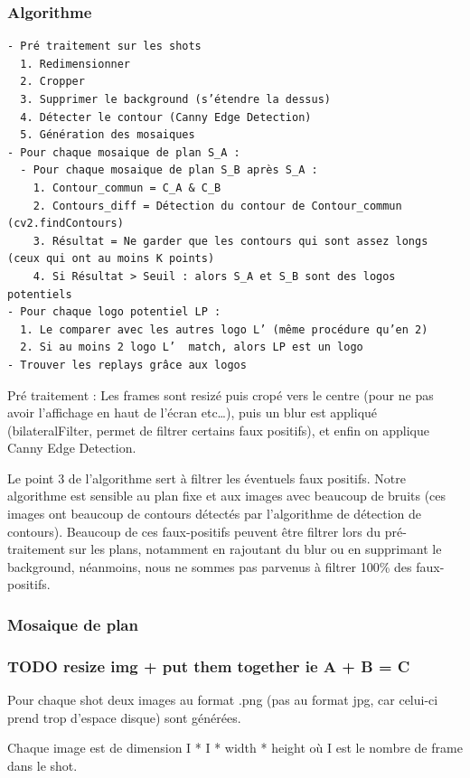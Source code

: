 \documentclass[11pt]{article}
\begin{document}
\subsubsection{Algorithme}
\label{sec:org46ef06d}
\begin{verbatim}
- Pré traitement sur les shots
  1. Redimensionner
  2. Cropper
  3. Supprimer le background (s’étendre la dessus)
  4. Détecter le contour (Canny Edge Detection)
  5. Génération des mosaiques
- Pour chaque mosaique de plan S_A :
  - Pour chaque mosaique de plan S_B après S_A :
    1. Contour_commun = C_A & C_B
    2. Contours_diff = Détection du contour de Contour_commun (cv2.findContours)
    3. Résultat = Ne garder que les contours qui sont assez longs (ceux qui ont au moins K points)
    4. Si Résultat > Seuil : alors S_A et S_B sont des logos potentiels
- Pour chaque logo potentiel LP :
  1. Le comparer avec les autres logo L’ (même procédure qu’en 2)
  2. Si au moins 2 logo L’  match, alors LP est un logo
- Trouver les replays grâce aux logos
\end{verbatim}
Pré traitement :
Les frames sont resizé puis cropé vers le centre (pour ne pas avoir l'affichage en haut de l'écran etc\ldots{}), puis un blur est appliqué (bilateralFilter, permet de filtrer certains faux positifs), et enfin on applique Canny Edge Detection.

Le point 3 de l’algorithme sert à filtrer les éventuels faux positifs.
Notre algorithme est sensible au plan fixe et aux images avec beaucoup de bruits (ces images ont beaucoup de contours détectés par l’algorithme de détection de contours).
Beaucoup de ces faux-positifs peuvent être filtrer lors du pré-traitement sur les plans, notamment en rajoutant du blur ou en supprimant le background, néanmoins, nous ne sommes pas parvenus à filtrer 100\% des faux-positifs.

\subsubsection{Mosaique de plan}
\label{sec:orgfcc85c9}
\subsubsection{{\bfseries\sffamily TODO} resize img + put them together ie A + B = C}
\label{sec:org7794fd1}
Pour chaque shot deux images au format .png (pas au format jpg, car celui-ci prend trop d'espace disque) sont générées.

Chaque image est de dimension I * I * width * height où I est le nombre de frame dans le shot.
\end{document}
